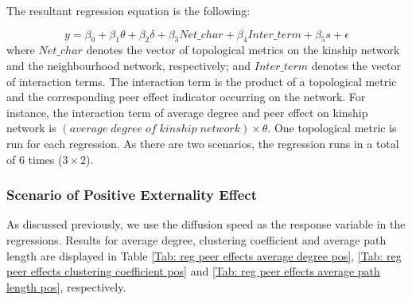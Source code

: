 \documentclass{bmcart}
\renewcommand{\tablename}{Table }
\begin{document}
\begin{table}
\begin{center}
\caption{Correlations between Network Characteristics (Positive Externality Effect)}
\label{Tab: correlation network characteristics pos}
\end{center}
\end{table}

The resultant regression equation is the following:

\begin{equation}
\label{Eq: peer effects and network characteristics}
y=\beta_0 + \beta_1 \theta + \beta_2 \delta + \beta_3 Net\_char + \beta_4 Inter\_term + \beta_5s+ \epsilon
\end{equation}
where $Net\_char$ denotes the vector of topological metrics on the kinship network and the neighbourhood network, respectively; and $Inter\_term$ denotes the vector of interaction terms. The interaction term is the product of a topological metric and the corresponding peer effect indicator occurring on the network. For instance, the interaction term of average degree and peer effect on kinship network is $(average\; degree\; of\; kinship\; network)\times \theta$. One topological metric is run for each regression. As there are two scenarios, the regression runs in a total of 6 times ($3 \times 2$).

\subsubsection*{Scenario of Positive Externality Effect}
As discussed previously, we use the diffusion speed as the response variable in the regressions. Results for average degree, clustering coefficient and average path length are displayed in \tablename \ref{Tab: reg peer effects average degree pos}, \ref{Tab: reg peer effects clustering coefficient pos} and \ref{Tab: reg peer effects average path length pos}, respectively. 
\end{document}
